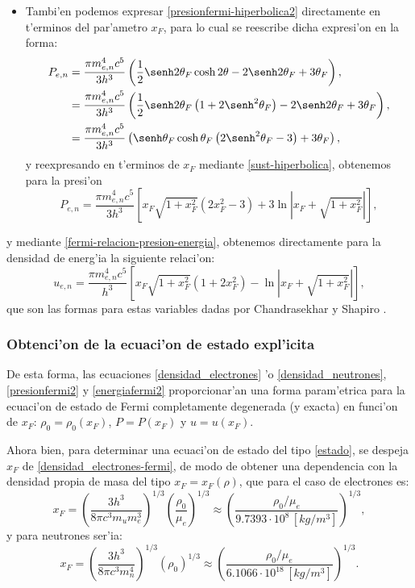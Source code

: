 \begin{itemize}
\item Tambi'en podemos expresar \eqref{presionfermi-hiperbolica2} directamente en t'erminos del par'ametro $x_F$, para lo cual se reescribe dicha expresi'on en la forma:
\begin{align}
P_{e,n}&=\frac{\pi m_{e,n}^4c^5}{3h^3}\left(\frac{1}{2}\senh2\theta_F\cosh2\theta-2\senh2\theta_F+3\theta_F\right),\\
&=\frac{\pi m_{e,n}^4c^5}{3h^3}\left(\frac{1}{2}\senh2\theta_F\left(1+2\senh^2\theta_F\right)-2\senh2\theta_F+3\theta_F\right),\\
&=\frac{\pi m_{e,n}^4c^5}{3h^3}\left(\senh\theta_F\cosh\theta_F\left(2\senh^2\theta_F-3\right)+3\theta_F\right),
\end{align}
y reexpresando en t'erminos de $x_F$ mediante \eqref{sust-hiperbolica}, obtenemos para la presi'on
\begin{equation}\label{presionfermi2}
\boxed{ P_{e,n}=\frac{\pi m_{e,n}^4c^5}{3h^3}\left[x_F\sqrt{1+x_F^2}\left(2x_F^2-3\right)+3\ln\left|x_F+\sqrt{1+x_F^2}\right|\right],}
\end{equation}
\end{itemize}
y mediante \eqref{fermi-relacion-presion-energia}, obtenemos directamente para la densidad de energ'ia la siguiente relaci'on:
\begin{equation}\label{energiafermi2}
 \boxed{u_{e,n}=\frac{\pi m_{e,n}^4c^5}{h^3}\left[x_F\sqrt{1+x_F^2}\left(1+2x_F^2\right)-\ln\left|x_F+\sqrt{1+x_F^2}\right|\right],}
\end{equation}
que son las formas para estas variables dadas por Chandrasekhar \cite{Chandra39} y Shapiro \cite{Shapiro83}.


\subsubsection{Obtenci'on de la ecuaci'on de estado expl'icita}

De esta forma, las ecuaciones \eqref{densidad_electrones} 'o \eqref{densidad_neutrones}, \eqref{presionfermi2} y \eqref{energiafermi2} proporcionar'an una forma param'etrica para la ecuaci'on de estado de Fermi completamente degenerada (y exacta) en funci'on de $x_F$: $\rho_0=\rho_0(x_F)$, $P=P(x_F)$ y $u=u(x_F)$.

Ahora bien, para determinar una ecuaci'on de estado del tipo \eqref{estado}, se despeja $x_F$ de \eqref{densidad_electrones-fermi}, de modo de obtener una dependencia con la densidad propia de masa del tipo $x_F=x_F(\rho)$, que para el caso de electrones es:
\begin{equation}\label{xrelativo_electrones}
 x_F=\left(\frac{3h^3}{8\pi c^3 m_u m_e^3}\right)^{1/3}\left(\frac{\rho_0}{\mu_e}\right)^{1/3}\approx\left(\frac{\rho_0/\mu_e}{9.7393\cdot10^8\,[kg/m^3]}\right)^{1/3},
\end{equation}
y para neutrones ser'ia:
\begin{equation}\label{xrelativo_neutrones}
 x_F=\left(\frac{3h^3}{8\pi c^3 m_n^4}\right)^{1/3}\left(\rho_0\right)^{1/3}\approx\left(\frac{\rho_0/\mu_e}{6.1066\cdot10^{18}\,[kg/m^3]}\right)^{1/3}.
\end{equation}

